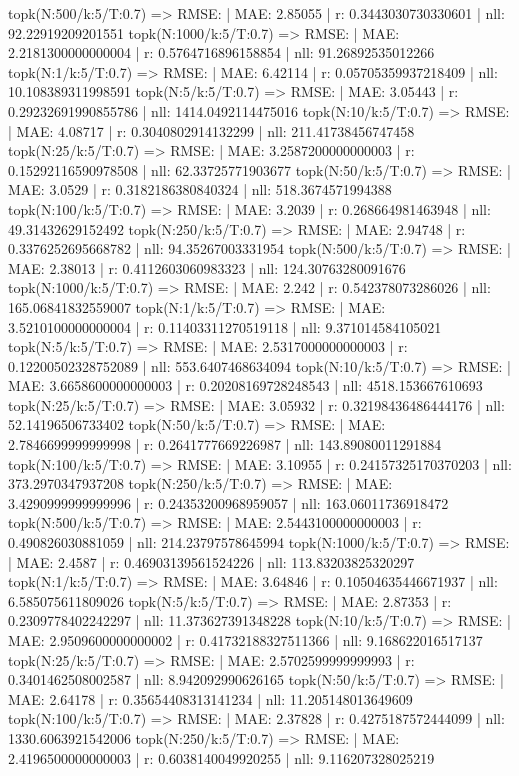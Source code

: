 topk(N:500/k:5/T:0.7) => RMSE: | MAE: 2.85055 | r: 0.3443030730330601 | nll: 92.22919209201551
topk(N:1000/k:5/T:0.7) => RMSE: | MAE: 2.2181300000000004 | r: 0.5764716896158854 | nll: 91.26892535012266
topk(N:1/k:5/T:0.7) => RMSE: | MAE: 6.42114 | r: 0.05705359937218409 | nll: 10.108389311998591
topk(N:5/k:5/T:0.7) => RMSE: | MAE: 3.05443 | r: 0.29232691990855786 | nll: 1414.0492114475016
topk(N:10/k:5/T:0.7) => RMSE: | MAE: 4.08717 | r: 0.3040802914132299 | nll: 211.41738456747458
topk(N:25/k:5/T:0.7) => RMSE: | MAE: 3.2587200000000003 | r: 0.15292116590978508 | nll: 62.33725771903677
topk(N:50/k:5/T:0.7) => RMSE: | MAE: 3.0529 | r: 0.3182186380840324 | nll: 518.3674571994388
topk(N:100/k:5/T:0.7) => RMSE: | MAE: 3.2039 | r: 0.268664981463948 | nll: 49.31432629152492
topk(N:250/k:5/T:0.7) => RMSE: | MAE: 2.94748 | r: 0.3376252695668782 | nll: 94.35267003331954
topk(N:500/k:5/T:0.7) => RMSE: | MAE: 2.38013 | r: 0.4112603060983323 | nll: 124.30763280091676
topk(N:1000/k:5/T:0.7) => RMSE: | MAE: 2.242 | r: 0.542378073286026 | nll: 165.06841832559007
topk(N:1/k:5/T:0.7) => RMSE: | MAE: 3.5210100000000004 | r: 0.11403311270519118 | nll: 9.371014584105021
topk(N:5/k:5/T:0.7) => RMSE: | MAE: 2.5317000000000003 | r: 0.12200502328752089 | nll: 553.6407468634094
topk(N:10/k:5/T:0.7) => RMSE: | MAE: 3.6658600000000003 | r: 0.20208169728248543 | nll: 4518.153667610693
topk(N:25/k:5/T:0.7) => RMSE: | MAE: 3.05932 | r: 0.32198436486444176 | nll: 52.14196506733402
topk(N:50/k:5/T:0.7) => RMSE: | MAE: 2.7846699999999998 | r: 0.2641777669226987 | nll: 143.89080011291884
topk(N:100/k:5/T:0.7) => RMSE: | MAE: 3.10955 | r: 0.24157325170370203 | nll: 373.2970347937208
topk(N:250/k:5/T:0.7) => RMSE: | MAE: 3.4290999999999996 | r: 0.24353200968959057 | nll: 163.06011736918472
topk(N:500/k:5/T:0.7) => RMSE: | MAE: 2.5443100000000003 | r: 0.490826030881059 | nll: 214.23797578645994
topk(N:1000/k:5/T:0.7) => RMSE: | MAE: 2.4587 | r: 0.46903139561524226 | nll: 113.83203825320297
topk(N:1/k:5/T:0.7) => RMSE: | MAE: 3.64846 | r: 0.10504635446671937 | nll: 6.585075611809026
topk(N:5/k:5/T:0.7) => RMSE: | MAE: 2.87353 | r: 0.2309778402242297 | nll: 11.373627391348228
topk(N:10/k:5/T:0.7) => RMSE: | MAE: 2.9509600000000002 | r: 0.41732188327511366 | nll: 9.168622016517137
topk(N:25/k:5/T:0.7) => RMSE: | MAE: 2.5702599999999993 | r: 0.3401462508002587 | nll: 8.942092990626165
topk(N:50/k:5/T:0.7) => RMSE: | MAE: 2.64178 | r: 0.35654408313141234 | nll: 11.205148013649609
topk(N:100/k:5/T:0.7) => RMSE: | MAE: 2.37828 | r: 0.4275187572444099 | nll: 1330.6063921542006
topk(N:250/k:5/T:0.7) => RMSE: | MAE: 2.4196500000000003 | r: 0.6038140049920255 | nll: 9.116207328025219
